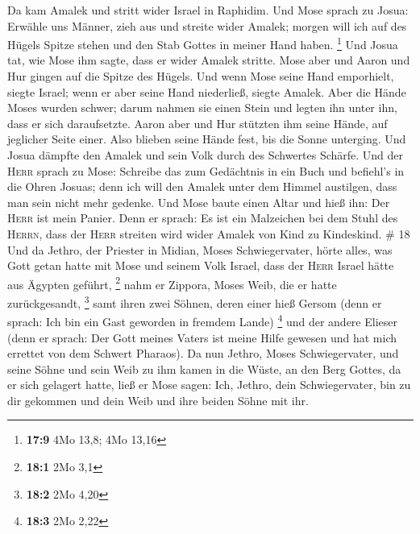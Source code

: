  Da kam Amalek und stritt wider Israel in Raphidim.
 Und Mose sprach zu Josua: Erwähle uns Männer, zieh aus
und streite wider Amalek; morgen will ich auf des Hügels Spitze stehen
und den Stab Gottes in meiner Hand haben. \footnote{\textbf{17:9} 4Mo
  13,8; 4Mo 13,16}  Und Josua tat, wie Mose ihm sagte,
dass er wider Amalek stritte. Mose aber und Aaron und Hur gingen auf die
Spitze des Hügels.  Und wenn Mose seine Hand emporhielt,
siegte Israel; wenn er aber seine Hand niederließ, siegte Amalek.
 Aber die Hände Moses wurden schwer; darum nahmen sie
einen Stein und legten ihn unter ihn, dass er sich daraufsetzte. Aaron
aber und Hur stützten ihm seine Hände, auf jeglicher Seite einer. Also
blieben seine Hände fest, bis die Sonne unterging.  Und
Josua dämpfte den Amalek und sein Volk durch des Schwertes Schärfe.
 Und der \textsc{Herr} sprach zu Mose: Schreibe das zum
Gedächtnis in ein Buch und befiehl's in die Ohren Josuas; denn ich will
den Amalek unter dem Himmel austilgen, dass man sein nicht mehr gedenke.
 Und Mose baute einen Altar und hieß ihn: Der
\textsc{Herr} ist mein Panier.  Denn er sprach: Es ist
ein Malzeichen bei dem Stuhl des \textsc{Herrn}, dass der \textsc{Herr}
streiten wird wider Amalek von Kind zu Kindeskind. \# 18 
Und da Jethro, der Priester in Midian, Moses Schwiegervater, hörte
alles, was Gott getan hatte mit Mose und seinem Volk Israel, dass der
\textsc{Herr} Israel hätte aus Ägypten geführt, \footnote{\textbf{18:1}
  2Mo 3,1}  nahm er Zippora, Moses Weib, die er hatte
zurückgesandt, \footnote{\textbf{18:2} 2Mo 4,20}  samt
ihren zwei Söhnen, deren einer hieß Gersom (denn er sprach: Ich bin ein
Gast geworden in fremdem Lande) \footnote{\textbf{18:3} 2Mo 2,22}
 und der andere Elieser (denn er sprach: Der Gott meines
Vaters ist meine Hilfe gewesen und hat mich errettet von dem Schwert
Pharaos).  Da nun Jethro, Moses Schwiegervater, und seine
Söhne und sein Weib zu ihm kamen in die Wüste, an den Berg Gottes, da er
sich gelagert hatte,  ließ er Mose sagen: Ich, Jethro,
dein Schwiegervater, bin zu dir gekommen und dein Weib und ihre beiden
Söhne mit ihr.


